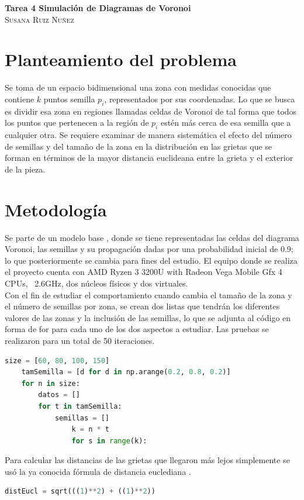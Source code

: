 \documentclass{article}
\begin{document}
	\begin{center}
	\huge{\textbf{Tarea 4 Simulación de Diagramas de Voronoi}}\\
	
	\textsc{ \Large Susana Ruiz Nuñez}
	\end{center}


\section{Planteamiento del problema} 
Se toma de un espacio bidimensional \cite{satu} una zona con medidas conocidas que contiene $k$ puntos semilla $p_i$, representados por sus coordenadas. Lo que se busca es dividir esa zona en regiones llamadas celdas de Voronoi de tal forma que todos los puntos que pertenecen a la región de $p_i$ estén más cerca de esa semilla que a cualquier otra. Se requiere examinar de manera sistemática el efecto del número de semillas y del tamaño de la zona en la distribución en las grietas que se forman en términos de la mayor distancia euclideana entre la grieta y el exterior de la pieza.


\section{Metodología}
Se parte de un modelo base \cite{satu}, donde se tiene representadas las celdas del diagrama Voronoi, las semillas y su propagación dadas por una probabilidad inicial de 0.9; lo que posteriormente se cambia para fines del estudio. El equipo donde se realiza el proyecto cuenta con AMD Ryzen 3 3200U with Radeon Vega Mobile Gfx  4 CPUs, ~2.6GHz, dos núcleos físicos y dos virtuales.\\
Con el fin de estudiar el comportamiento cuando cambia el tamaño de la zona y el número de semillas por zona, se crean dos listas que tendrán los diferentes valores de las zonas y la inclusión de las semillas, lo que se adjunta al código en forma de for para cada uno de los dos aspectos a estudiar. Las pruebas se realizaron para un total de 50 iteraciones.
  

\begin{lstlisting}[language=Python]
	size = [60, 80, 100, 150]
	tamSemilla = [d for d in np.arange(0.2, 0.8, 0.2)]
	for n in size:
		datos = []
		for t in tamSemilla:
			semillas = []
				k = n * t
				for s in range(k):
\end{lstlisting}

Para calcular las distancias de las grietas que llegaron más lejos simplemente se usó la ya conocida fórmula de distancia euclediana \cite{satu2}.
\begin{lstlisting}[language=Python]
	distEucl = sqrt(((1)**2) + ((1)**2))
\end{lstlisting}
\end{document}
